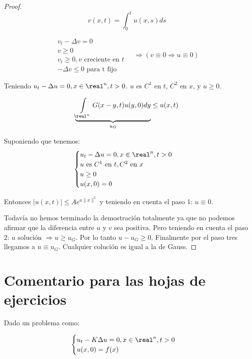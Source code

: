  			\begin{proof}

	 				\[v(x,t) = \int_0^t u(x,s) ds\]

	 				\[ \begin{array}{l}
	 					v_t - \Delta v = 0\\
	 					v \geq 0\\
	 					v_t \geq 0, v \text{ creciente en } t\\
	 					-\Delta v \leq 0 \text{ para t fijo}
	 				\end{array} \quad \Rightarrow (v \equiv 0 \Rightarrow u \equiv 0) \]


 					Teniendo $u_t - \Delta u = 0, x \in \real^n, t > 0$. $u$ es $C^1$ en $t$, $C^2$ en $x$, y $u \geq 0$.

 					\[ \underbrace{\int\limits_{\real^n} G(x-y,t) u(y,0) dy}_{u_G} \leq u(x,t) \]


 					Suponiendo que tenemos: \[
 					\begin{cases}
 						u_t - \Delta u = 0, x \in \real^n, t > 0\\
 						u \text{ es } C^1 \text{ en } t, C^2 \text{ en } x\\
 						u \geq 0\\
 						u(x,0) = 0
 					\end{cases}\]

 					Entonces $|u(x,t)| \leq A e^{a\|x\|^2}$ y teniendo en cuenta el paso 1: $u \equiv 0$.


 				Todavía no hemos terminado la demostración totalmente ya que no podemos afirmar que la diferencia entre $u$ y $v$ sea positiva. Pero teniendo en cuenta el paso 2: $u$ solución $\Rightarrow u \geq u_G$. Por lo tanto $u - u_G \geq 0$. Finalmente por el paso tres llegamos a $u \equiv u_G$. Cualquier colución es igual a la de Gauss.

 			\end{proof}


\section*{Comentario para las hojas de ejercicios}

Dado un problema como:

\[\begin{cases}
	u_t - K \Delta u = 0, x \in \real^n, t > 0 \\
	u(x,0) = f(x)
\end{cases}\]

